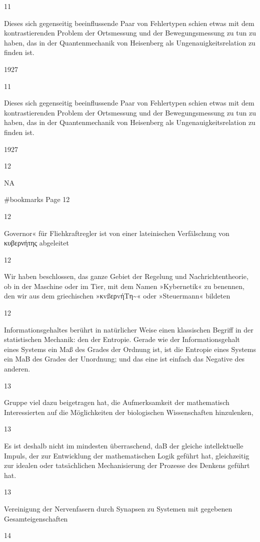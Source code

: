 \documentclass[
  letterpaper,
  DIV=11,
  numbers=noendperiod]{scrartcl}
\begin{document}
11

Dieses sich gegenseitig beeinflussende Paar von Fehlertypen schien etwas
mit dem kontrastierenden Problem der Ortsmessung und der
Bewegungsmessung zu tun zu haben, das in der Quantenmechanik von
Heisenberg als Ungenauigkeitsrelation zu finden ist.

1927

11

Dieses sich gegenseitig beeinflussende Paar von Fehlertypen schien etwas
mit dem kontrastierenden Problem der Ortsmessung und der
Bewegungsmessung zu tun zu haben, das in der Quantenmechanik von
Heisenberg als Ungenauigkeitsrelation zu finden ist.

1927

12

NA

\#bookmarks Page 12

12

Governor« für Fliehkraftregler ist von einer lateinischen Verfälschung
von κυβερνήτης abgeleitet

12

Wir haben beschlossen, das ganze Gebiet der Regelung und
Nachrichtentheorie, ob in der Maschine oder im Tier, mit dem Namen
»Kybernetik« zu benennen, den wir aus dem griechischen
»κvßερvήΤη\textasciitilde« oder »Steuermann« bildeten

12

Informationsgehaltes berührt in natürlicher Weise einen klassischen
Begriff in der statistischen Mechanik: den der Entropie. Gerade wie der
Informationsgehalt eines Systems ein Maß des Grades der Ordnung ist, ist
die Entropie eines Systems ein MaB des Grades der Unordnung; und das
eine ist einfach das Negative des anderen.

13

Gruppe viel dazu beigetragen hat, die Aufmerksamkeit der mathematisch
Interessierten auf die Möglichkeiten der biologischen Wissenschaften
hinzulenken,

13

Es ist deshalb nicht im mindesten überraschend, daB der gleiche
intellektuelle Impuls, der zur Entwicklung der mathematischen Logik
geführt hat, gleichzeitig zur idealen oder tatsächlichen Mechanisierung
der Prozesse des Denkens geführt hat.

13

Vereinigung der Nervenfasern durch Synapsen zu Systemen mit gegebenen
Gesamteigenschaften

14
\end{document}
